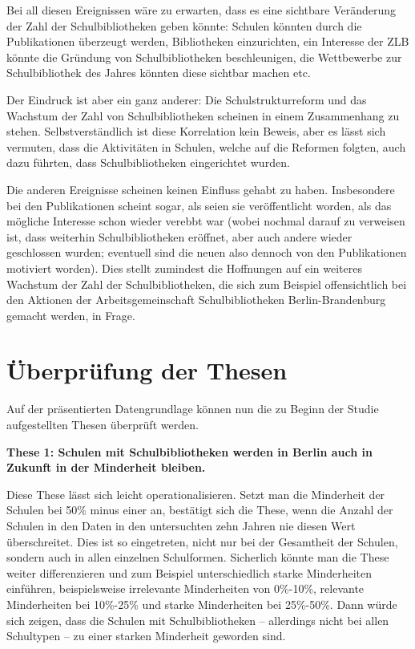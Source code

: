 \documentclass[a4paper,
fontsize=11pt,
oneside,
numbers=noperiodatend,
parskip=half-,
bibliography=totoc,
final
]{scrartcl}
\begin{document}
Bei all diesen Ereignissen wäre zu erwarten, dass es eine sichtbare
Veränderung der Zahl der Schulbibliotheken geben könnte: Schulen könnten
durch die Publikationen überzeugt werden, Bibliotheken einzurichten, ein
Interesse der ZLB könnte die Gründung von Schulbibliotheken
beschleunigen, die Wettbewerbe zur Schulbibliothek des Jahres könnten
diese sichtbar machen etc.

Der Eindruck ist aber ein ganz anderer: Die Schulstrukturreform und das
Wachstum der Zahl von Schulbibliotheken scheinen in einem Zusammenhang
zu stehen. Selbstverständlich ist diese Korrelation kein Beweis, aber es
lässt sich vermuten, dass die Aktivitäten in Schulen, welche auf die
Reformen folgten, auch dazu führten, dass Schulbibliotheken eingerichtet
wurden.

Die anderen Ereignisse scheinen keinen Einfluss gehabt zu haben.
Insbesondere bei den Publikationen scheint sogar, als seien sie
veröffentlicht worden, als das mögliche Interesse schon wieder verebbt
war (wobei nochmal darauf zu verweisen ist, dass weiterhin
Schulbibliotheken eröffnet, aber auch andere wieder geschlossen wurden;
eventuell sind die neuen also dennoch von den Publikationen motiviert
worden). Dies stellt zumindest die Hoffnungen auf ein weiteres Wachstum
der Zahl der Schulbibliotheken, die sich zum Beispiel offensichtlich bei
den Aktionen der Arbeitsgemeinschaft Schulbibliotheken
Berlin-Brandenburg gemacht werden, in Frage.

\section{Überprüfung der
Thesen}\label{uxfcberpruxfcfung-der-thesen}

Auf der präsentierten Datengrundlage können nun die zu Beginn der Studie
aufgestellten Thesen überprüft werden.

\textbf{These 1: Schulen mit Schulbibliotheken werden in Berlin auch in Zukunft
in der Minderheit bleiben.}

Diese These lässt sich leicht operationalisieren. Setzt man die
Minderheit der Schulen bei 50\% minus einer an, bestätigt sich die
These, wenn die Anzahl der Schulen in den Daten in den untersuchten zehn
Jahren nie diesen Wert überschreitet. Dies ist so eingetreten, nicht nur
bei der Gesamtheit der Schulen, sondern auch in allen einzelnen
Schulformen. Sicherlich könnte man die These weiter differenzieren und
zum Beispiel unterschiedlich starke Minderheiten einführen,
beispielsweise irrelevante Minderheiten von 0\%-10\%, relevante
Minderheiten bei 10\%-25\% und starke Minderheiten bei 25\%-50\%. Dann
würde sich zeigen, dass die Schulen mit Schulbibliotheken -- allerdings
nicht bei allen Schultypen -- zu einer starken Minderheit geworden sind.
\end{document}
